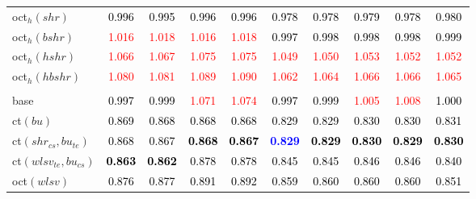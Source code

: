 \begin{tabular}[t]{>{\centering\arraybackslash}m{2.5cm}ccccccccc}
oct$_h(shr)$ & \textcolor{black}{0.996} & \textcolor{black}{0.995} & \textcolor{black}{0.996} & \textcolor{black}{0.996} & \textcolor{black}{0.978} & \textcolor{black}{0.978} & \textcolor{black}{0.979} & \textcolor{black}{0.978} & \textcolor{black}{0.980}\\
oct$_h(bshr)$ & \textcolor{red}{1.016} & \textcolor{red}{1.018} & \textcolor{red}{1.016} & \textcolor{red}{1.018} & \textcolor{black}{0.997} & \textcolor{black}{0.998} & \textcolor{black}{0.998} & \textcolor{black}{0.998} & \textcolor{black}{0.999}\\
oct$_h(hshr)$ & \textcolor{red}{1.066} & \textcolor{red}{1.067} & \textcolor{red}{1.075} & \textcolor{red}{1.075} & \textcolor{red}{1.049} & \textcolor{red}{1.050} & \textcolor{red}{1.053} & \textcolor{red}{1.052} & \textcolor{red}{1.052}\\
oct$_h(hbshr)$ & \textcolor{red}{1.080} & \textcolor{red}{1.081} & \textcolor{red}{1.089} & \textcolor{red}{1.090} & \textcolor{red}{1.062} & \textcolor{red}{1.064} & \textcolor{red}{1.066} & \textcolor{red}{1.066} & \textcolor{red}{1.065}\\
\addlinespace[0.3em]
\multicolumn{10}{c}{\textbf{$k = 2$}}\\
base & \textcolor{black}{0.997} & \textcolor{black}{0.999} & \textcolor{red}{1.071} & \textcolor{red}{1.074} & \textcolor{black}{0.997} & \textcolor{black}{0.999} & \textcolor{red}{1.005} & \textcolor{red}{1.008} & \textcolor{black}{1.000}\\
ct$(bu)$ & \textcolor{black}{0.869} & \textcolor{black}{0.868} & \textcolor{black}{0.868} & \textcolor{black}{0.868} & \textcolor{black}{0.829} & \textcolor{black}{0.829} & \textcolor{black}{0.830} & \textcolor{black}{0.830} & \textcolor{black}{0.831}\\
ct$(shr_{cs}, bu_{te})$ & \textcolor{black}{0.868} & \textcolor{black}{0.867} & \textcolor{black}{\textbf{0.868}} & \textcolor{black}{\textbf{0.867}} & \textcolor{blue}{\textbf{0.829}} & \textcolor{black}{\textbf{0.829}} & \textcolor{black}{\textbf{0.830}} & \textcolor{black}{\textbf{0.829}} & \textcolor{black}{\textbf{0.830}}\\
ct$(wlsv_{te}, bu_{cs})$ & \textcolor{black}{\textbf{0.863}} & \textcolor{black}{\textbf{0.862}} & \textcolor{black}{0.878} & \textcolor{black}{0.878} & \textcolor{black}{0.845} & \textcolor{black}{0.845} & \textcolor{black}{0.846} & \textcolor{black}{0.846} & \textcolor{black}{0.840}\\
oct$(wlsv)$ & \textcolor{black}{0.876} & \textcolor{black}{0.877} & \textcolor{black}{0.891} & \textcolor{black}{0.892} & \textcolor{black}{0.859} & \textcolor{black}{0.860} & \textcolor{black}{0.860} & \textcolor{black}{0.860} & \textcolor{black}{0.851}\\

\end{tabular}

